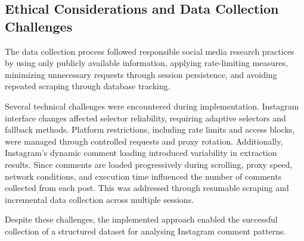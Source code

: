 \subsection{Ethical Considerations and Data Collection Challenges}

The data collection process followed responsible social media research practices by using only publicly available information, applying rate-limiting measures, minimizing unnecessary requests through session persistence, and avoiding repeated scraping through database tracking.

Several technical challenges were encountered during implementation. Instagram interface changes affected selector reliability, requiring adaptive selectors and fallback methods. Platform restrictions, including rate limits and access blocks, were managed through controlled requests and proxy rotation. Additionally, Instagram's dynamic comment loading introduced variability in extraction results. Since comments are loaded progressively during scrolling, proxy speed, network conditions, and execution time influenced the number of comments collected from each post. This was addressed through resumable scraping and incremental data collection across multiple sessions.

Despite these challenges, the implemented approach enabled the successful collection of a structured dataset for analysing Instagram comment patterns.
